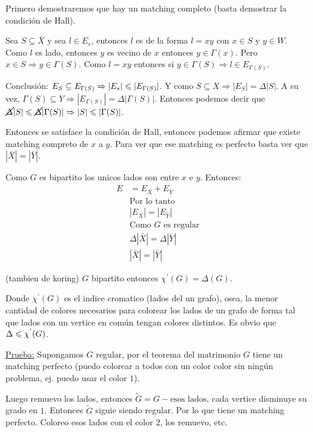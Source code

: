 \documentclass[12pt,a4paper]{article}
\begin{document}
Primero demostraremos que hay un matching completo (basta demostrar la condición de Hall).
\medskip

Sea $S \subseteq \bar{X}$ y sea $l \in E_{s}$, entonces $l$ es de la forma $l=xy$ con 
$x\in S$ y $y\in W$. Como $l$ es lado, entonces $y$ es vecino de $x$ entonces $y\in \Gamma(x)$. 
Pero $x\in S \Rightarrow y\in \Gamma(S)$. Como $l=xy$ entonces si $y\in \Gamma(S) \Rightarrow l\in E_{\Gamma(S)}$.
\medskip

Conclusión: $E_{S} \subseteq E_{\Gamma(S)} \Rightarrow |E_{s}| \leqslant |E_{\Gamma(S)}|$. Y 
como $S \subseteq X \Rightarrow |E_{S}| = \Delta |S|$. A su vez, $\Gamma(S) \subseteq Y \Rightarrow |E_{\Gamma(S)}| = \Delta |\Gamma(S)|$. 
Entonces podemos decir que $\cancel{\Delta} |S| \leqslant \cancel{\Delta} |\Gamma(S)| \Rightarrow |S| \leqslant |\Gamma(S)|$.
\medskip

Entonces se satisface la condición de Hall, entonces podemos afirmar que existe matching compreto 
de $x$ a $y$. Para ver que ese matching es perfecto basta ver que $|\bar{X}| = |\bar{Y}|$.
\medskip

Como $G$ es bipartito los unicos lados son entre $x$ e $y$. Entonces:
\begin{align*}
    E &= E_{\bar{X}} + E_{\bar{Y}}\\
    &\text{Por lo tanto}\\
    &|E_{\bar{X}}| = |E_{\bar{Y}}|\\
    &\text{Como $G$ es regular}\\
    &\Delta |\bar{X}| = \Delta |\bar{Y}|\\
    &|\bar{X}| = |\bar{Y}|
\end{align*}

\begin{corolario} (tambien de koring) $G$ bipartito entonces $\chi^{'}(G) = \Delta(G)$.
\end{corolario}

Donde $\chi^{'}(G)$ es el indice cromatico (lados del un grafo), osea, la menor 
cantidad de colores necesarios para colorear los lados de un grafo de forma tal 
que lados con un vertice en común tengan colores distintos. Es obvio que $\Delta \leqslant \chi^{'}(G)$.
\medskip

\underline{Prueba:} Supongamos $G$ regular, por el teorema del matrimonio $G$ 
tiene un matching perfecto (puedo colorear a todos con un color color sin 
ningún problema, ej. puedo usar el color $1$).
\medskip

Luego remuevo los lados, entonces $\widetilde{G} = G -\text{esos lados}$, cada 
vertice disminuye su grado en $1$. Entonces $\widetilde{G}$ siguie siendo regular. 
Por lo que tiene un matching perfecto. Coloreo esos lados con el color $2$, los remuevo, etc.
\medskip
\end{document}

